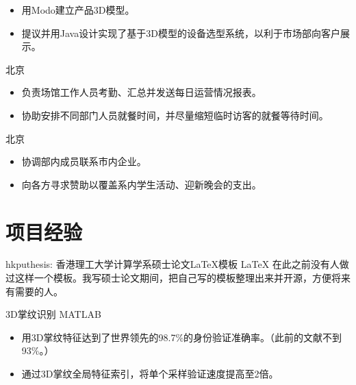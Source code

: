 \documentclass[11pt,a4paper]{moderncv/moderncv}
\begin{document}
{
\begin{itemize}
	\item 用Modo建立产品3D模型。
	\item 提议并用Java设计实现了基于3D模型的设备选型系统，以利于市场部向客户展示。
\end{itemize}
}

{北京}{}
{
\begin{itemize}
	\item 负责场馆工作人员考勤、汇总并发送每日运营情况报表。
	\item 协助安排不同部门人员就餐时间，并尽量缩短临时访客的就餐等待时间。
\end{itemize}
}

{北京}{}
{
\begin{itemize}
	\item 协调部内成员联系市内企业。
	\item 向各方寻求赞助以覆盖系内学生活动、迎新晚会的支出。
\end{itemize}
}

\section{项目经验}
% 
% 
{hkputhesis: 香港理工大学计算学系硕士论文\LaTeX 模板}
{LaTeX}
{}{}
{
在此之前没有人做过这样一个模板。我写硕士论文期间，把自己写的模板整理出来并开源，方便将来有需要的人。
}

{3D掌纹识别}
{MATLAB}
{}{}
{
\begin{itemize}
	\item 用3D掌纹特征达到了世界领先的98.7\%的身份验证准确率。（此前的文献不到93\%。）
	\item 通过3D掌纹全局特征索引，将单个采样验证速度提高至2倍。
\end{itemize}
}
\end{document}
